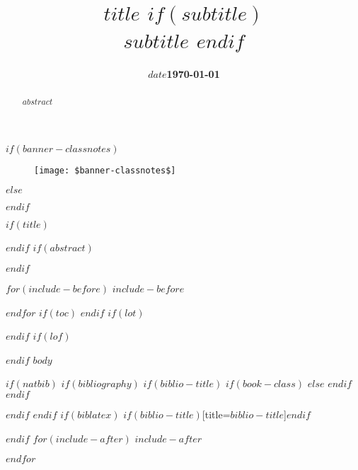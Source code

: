 \documentclass[$if(fontsize)$$fontsize$,$endif$$if(lang)$$lang$,$endif$$if(papersize)$$papersize$,$endif$$for(classoption)$$classoption$$sep$,$endfor$]{$documentclass$}
\title{
    $title$
    $if(subtitle)$
      \\\vspace{0.3em}
      \large \emph{$subtitle$}
    $endif$
  }
\author{
  $for(author)$
    \normalsize\textbf{$author.name$}\footnotesize$$^$author.id$$$\vspace{0.05in} \\
    \footnotesize$$^$author.id$$$\normalsize\emph{$author.affiliation$} \\
    \normalsize \emph{$author.department$} \\
    \footnotesize \hspace{1.5cm}\texttt{\url{$author.email$}} 
    \newline \vspace*{-0.1cm} $sep$ \and
  $endfor$
}
\date{\footnotesize \textbf{$date$}}
\date{\footnotesize \textbf{\today}}
\begin{document}
$if(banner-classnotes)$
\begin{figure}
  \centering
  \vspace{-1.5cm}
  \texttt{[image: \$banner-classnotes\$]}
  \vspace{-1.0cm}
\end{figure}
$else$
  \begin{figure}
  \centering
  \vspace{-1.0cm}
  \vspace{-1.5cm}
\end{figure}    
$endif$

$if(title)$
\maketitle
$endif$
$if(abstract)$
\begin{abstract}
$abstract$
\end{abstract}
$endif$

$for(include-before)$
$include-before$

$endfor$
$if(toc)$
{
\hypersetup{linkcolor=$if(toccolor)$$toccolor$$else$black$endif$}
\setcounter{tocdepth}{$toc-depth$}
\tableofcontents
}
$endif$
$if(lot)$
\listoftables
$endif$
$if(lof)$
\listoffigures
$endif$
$body$

$if(natbib)$
$if(bibliography)$
$if(biblio-title)$
$if(book-class)$
\renewcommand\bibname{$biblio-title$}
$else$
\renewcommand\refname{$biblio-title$}
$endif$
$endif$


$endif$
$endif$
$if(biblatex)$
\printbibliography$if(biblio-title)$[title=$biblio-title$]$endif$

$endif$
$for(include-after)$
$include-after$

$endfor$
\end{document}
